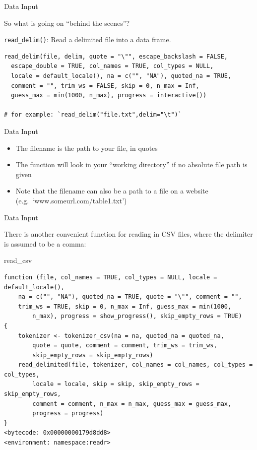 \documentclass[
  ignorenonframetext,
]{beamer}
\newenvironment{Shaded}{\begin{snugshade}}{\end{snugshade}}
\newcommand{\NormalTok}[1]{#1}
\providecommand{\tightlist}{%
  \setlength{\itemsep}{0pt}\setlength{\parskip}{0pt}}
\begin{document}
\begin{frame}[fragile]{Data Input}
\protect\hypertarget{data-input-5}{}

So what is going on ``behind the scenes''?

\texttt{read\_delim()}: Read a delimited file into a data frame.

\begin{verbatim}
read_delim(file, delim, quote = "\"", escape_backslash = FALSE,
  escape_double = TRUE, col_names = TRUE, col_types = NULL,
  locale = default_locale(), na = c("", "NA"), quoted_na = TRUE,
  comment = "", trim_ws = FALSE, skip = 0, n_max = Inf,
  guess_max = min(1000, n_max), progress = interactive())
           
# for example: `read_delim("file.txt",delim="\t")`
\end{verbatim}

\end{frame}

\begin{frame}{Data Input}
\protect\hypertarget{data-input-6}{}

\begin{itemize}
\tightlist
\item
  The filename is the path to your file, in quotes
\item
  The function will look in your ``working directory'' if no absolute
  file path is given
\item
  Note that the filename can also be a path to a file on a website
  (e.g.~`www.someurl.com/table1.txt')
\end{itemize}

\end{frame}

\begin{frame}[fragile]{Data Input}
\protect\hypertarget{data-input-7}{}

There is another convenient function for reading in CSV files, where the
delimiter is assumed to be a comma:

\begin{Shaded}
\begin{Highlighting}[]
\NormalTok{read_csv}
\end{Highlighting}
\end{Shaded}

\begin{verbatim}
function (file, col_names = TRUE, col_types = NULL, locale = default_locale(), 
    na = c("", "NA"), quoted_na = TRUE, quote = "\"", comment = "", 
    trim_ws = TRUE, skip = 0, n_max = Inf, guess_max = min(1000, 
        n_max), progress = show_progress(), skip_empty_rows = TRUE) 
{
    tokenizer <- tokenizer_csv(na = na, quoted_na = quoted_na, 
        quote = quote, comment = comment, trim_ws = trim_ws, 
        skip_empty_rows = skip_empty_rows)
    read_delimited(file, tokenizer, col_names = col_names, col_types = col_types, 
        locale = locale, skip = skip, skip_empty_rows = skip_empty_rows, 
        comment = comment, n_max = n_max, guess_max = guess_max, 
        progress = progress)
}
<bytecode: 0x00000000179d8dd8>
<environment: namespace:readr>
\end{verbatim}

\end{frame}
\end{document}
